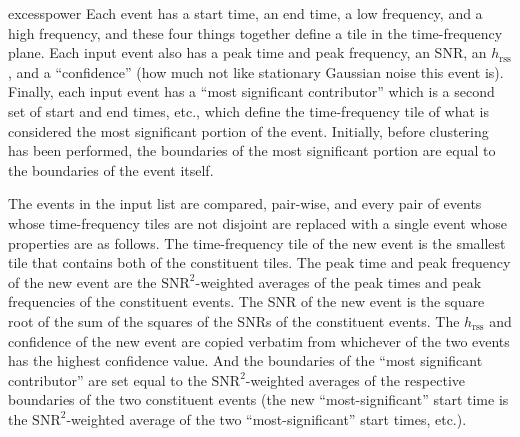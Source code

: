\documentclass[10pt]{article}
\newenvironment{entry}%
{\begin{list}{}{\renewcommand{\makelabel}[1]%
{\parbox[b]{\labelwidth}{\makebox[0pt][l]{\textbf{##1}}\\}}%
\setlength{\labelwidth}{1em}%
\setlength{\labelsep}{1em}%
\setlength{\leftmargin}{2em}%
\setlength{\topsep}{\medskipamount}%
\setlength{\itemsep}{\medskipamount}%
\setlength{\parsep}{\medskipamount}%
\setlength{\listparindent}{0pt}}}
{\end{list}}
\begin{document}
\begin{entry}
\item[excesspower]
Each event has a start time, an end time, a low frequency, and a high
frequency, and these four things together define a tile in the
time-frequency plane.  Each input event also has a peak time and peak
frequency, an SNR, an \(h_{\text{rss}}\), and a ``confidence'' (how much
not like stationary Gaussian noise this event is).  Finally, each input
event has a ``most significant contributor'' which is a second set of start
and end times, etc., which define the time-frequency tile of what is
considered the most significant portion of the event.  Initially, before
clustering has been performed, the boundaries of the most significant
portion are equal to the boundaries of the event itself.

The events in the input list are compared, pair-wise, and every pair of
events whose time-frequency tiles are not disjoint are replaced with a
single event whose properties are as follows.  The time-frequency tile of
the new event is the smallest tile that contains both of the constituent
tiles.  The peak time and peak frequency of the new event are the
\(\text{SNR}^{2}\)-weighted averages of the peak times and peak frequencies
of the constituent events.  The SNR of the new event is the square root of
the sum of the squares of the SNRs of the constituent events.  The
\(h_{\text{rss}}\) and confidence of the new event are copied verbatim from
whichever of the two events has the highest confidence value.  And the
boundaries of the ``most significant contributor'' are set equal to the
\(\text{SNR}^{2}\)-weighted averages of the respective boundaries of the
two constituent events (the new ``most-significant'' start time is the
\(\text{SNR}^{2}\)-weighted average of the two ``most-significant'' start
times, etc.).


\end{entry}
\end{document}
